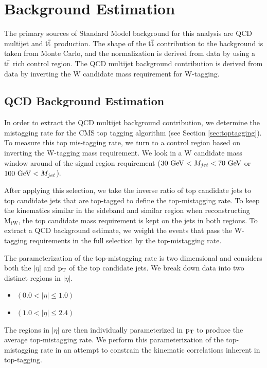 \clearpage
\newpage
\chapter{Background Estimation}
\label{sec:bsbackgroundEstimation}
The primary sources of Standard Model background for this analysis are QCD multijet and $\mathrm{t\overline{t}}$ production. 
The shape of the $\mathrm{t\overline{t}}$ contribution to the background is taken from Monte Carlo, and the normalization is derived from data by using a $\mathrm{t\overline{t}}$ rich control region.  The QCD multijet 
background contribution is derived from data by inverting the W candidate mass requirement for W-tagging.

\section{QCD Background Estimation}
\label{sec:bssideband}
\label{sec:bsqcdBackgroundEstimationProcedure}
In order to extract the QCD multijet background contribution, we determine the mistagging rate for the CMS top tagging algorithm (see Section \ref{sec:toptagging}).  
To measure this top mis-tagging rate, we turn to a control region based on inverting the W-tagging mass requirement.  We look in a W candidate mass window around of the signal region 
requirement ($30~\mathrm{GeV} < M_{jet} < 70~\mathrm{GeV}$ or $100~\mathrm{GeV} < M_{jet}$). 

After applying this selection, we take the inverse ratio of top candidate jets to top candidate jets that are top-tagged to define the top-mistagging rate.  
To keep the kinematics similar in the sideband and similar region when reconstructing $\mathrm{M_{tW}}$, the top candidate mass requirement is kept on the jets in both regions.  
To extract a QCD background estimate, we weight the events that pass the W-tagging requirements in the full selection by the top-mistagging rate.

The parameterization of the top-mistagging rate is two dimensional and considers both the $|\eta|$ and $\mathrm{p_{T}}$ of the top candidate jets.  
We break down data into two distinct regions in $|\eta|$. 


\begin{itemize}
	\item {} $(0.0 < |\eta| \leq 1.0)$
	\item {} $(1.0 < |\eta| \leq 2.4)$ 
\end{itemize}

The regions in $|\eta|$ are then individually parameterized in $\mathrm{p_{T}}$ to produce the average top-mistagging rate.  We perform this parameterization 
of the top-mistagging rate in an attempt to constrain the kinematic correlations inherent in top-tagging.

